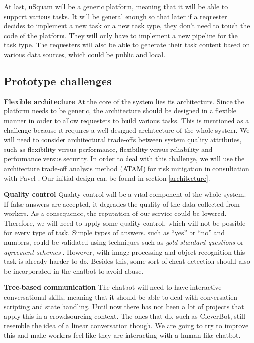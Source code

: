 \documentclass[a4paper,dutch,fleqn]{exam}
\begin{document}
At last, uSquam will be a generic platform, meaning that it will be able to support various tasks. It will be general enough so that later if a requester decides to implement a new task or a new task type, they don't need to touch the code of the platform. They will only have to implement a new pipeline for the task type. The requesters will also be able to generate their task content based on various data sources, which could be public and local. 

\subsection{Prototype challenges}
\textbf{Flexible architecture}
At the core of the system lies its architecture. Since the platform needs to be generic, the architecture should be designed in a flexible manner in order to allow requesters to build various tasks. This is mentioned as a challenge because it requires a well-designed architecture of the whole system. We will need to consider architectural trade-offs between system quality attributes, such as flexibility versus performance, flexibility versus reliability and performance versus security. In order to deal with this challenge, we will use the architecture trade-off analysis method (ATAM) for risk mitigation in consultation with Pavel \cite{kazman1998architecture}. Our initial design can be found in section \ref{architecture}.

\textbf{Quality control}
Quality control will be a vital component of the whole system. If false answers are accepted, it degrades the quality of the data collected from workers. As a consequence, the reputation of our service could be lowered. Therefore, we will need to apply some quality control, which will not be possible for every type of task. Simple types of answers, such as “yes” or “no” and numbers, could be validated using techniques such as \emph{gold standard questions} or \emph{agreement schemes} \cite{oleson2011programmatic}. However, with image processing and object recognition this task is already harder to do. Besides this, some sort of cheat detection should also be incorporated in the chatbot to avoid abuse.

\textbf{Tree-based communication}
The chatbot will need to have interactive conversational skills, meaning that it should be able to deal with conversation scripting and state handling. Until now there has not been a lot of projects that apply this in a crowdsourcing context. The ones that do, such as CleverBot, still resemble the idea of a linear conversation though. We are going to try to improve this and make workers feel like they are interacting with a human-like chatbot. 
\end{document}
